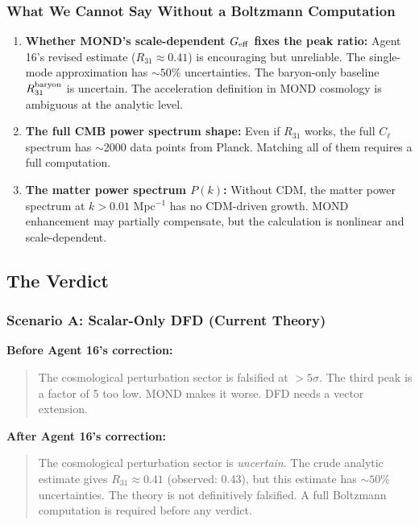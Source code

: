 \documentclass[11pt,a4paper]{article}
\begin{document}
\subsubsection{What We Cannot Say Without a Boltzmann Computation}

\begin{enumerate}
\item \textbf{Whether MOND's scale-dependent $G_{\rm eff}$ fixes the peak ratio:} Agent 16's revised estimate ($R_{31} \approx 0.41$) is encouraging but unreliable. The single-mode approximation has $\sim 50\%$ uncertainties. The baryon-only baseline $R_{31}^{\rm baryon}$ is uncertain. The acceleration definition in MOND cosmology is ambiguous at the analytic level.

\item \textbf{The full CMB power spectrum shape:} Even if $R_{31}$ works, the full $C_\ell$ spectrum has $\sim$2000 data points from Planck. Matching all of them requires a full computation.

\item \textbf{The matter power spectrum $P(k)$:} Without CDM, the matter power spectrum at $k > 0.01$ Mpc$^{-1}$ has no CDM-driven growth. MOND enhancement may partially compensate, but the calculation is nonlinear and scale-dependent.
\end{enumerate}

\subsection{The Verdict}

\subsubsection{Scenario A: Scalar-Only DFD (Current Theory)}

\textbf{Before Agent 16's correction:}
\begin{quote}
The cosmological perturbation sector is falsified at $>5\sigma$. The third peak is a factor of 5 too low. MOND makes it worse. DFD needs a vector extension.
\end{quote}

\textbf{After Agent 16's correction:}
\begin{quote}
The cosmological perturbation sector is \emph{uncertain}. The crude analytic estimate gives $R_{31} \approx 0.41$ (observed: 0.43), but this estimate has $\sim 50\%$ uncertainties. The theory is not definitively falsified. A full Boltzmann computation is required before any verdict.
\end{quote}
\end{document}
